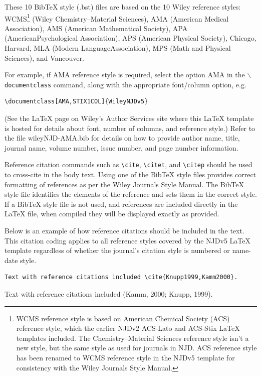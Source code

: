 \documentclass[11pt]{article}
\begin{document}
\noindent These 10 BibTeX style (.bst) f{i}les are based on the 10 Wiley reference styles: WCMS\footnote{WCMS reference style is based on American Chemical Society (ACS) reference style, which the earlier NJDv2 ACS-Lato and ACS-Stix LaTeX templates included. The Chemistry--Material Sciences reference style isn’t a new style, but the same style as used for journals in NJD. ACS reference style has been renamed to WCMS reference style in the NJDv5 template for consistency with the Wiley Journals Style Manual.} (Wiley Chemistry–Material Sciences), AMA (American Medical Association), AMS (American Mathematical Society), APA (American\break Psychological Association), APS (American Physical Society), Chicago, Harvard, MLA (Modern Language\break Association), MPS (Math and Physical Sciences), and Vancouver.

For example, if AMA reference style is required, select the option AMA in the {\tt $\backslash$documentclass} command, along with the appropriate font/column option, e.g.
\begin{verbatim}
\documentclass[AMA,STIX1COL]{WileyNJDv5}
\end{verbatim}
(See the LaTeX page on Wiley’s Author Services site where this LaTeX template is hosted for details about
font, number of columns, and reference style.)
Refer to the f{i}le wileyNJD-AMA.bib for details on how to provide author name, title, journal name, volume number, issue number, and page number information.

Reference citation commands such as \verb|\cite|, \verb|\citet|, and  \verb|\citep| should be used to cross-cite in the body text. Using one of the BibTeX style f{i}les provides correct formatting of references as per the Wiley Journals Style Manual. The BibTeX style f{i}le identif{i}es the elements of the reference  and sets them in the correct style.
If a BibTeX style f{i}le is not used, and references are included directly in the LaTeX f{i}le, when compiled they will be displayed exactly as provided.

Below is an example of how reference citations should be included in the text. This citation coding applies to all reference styles covered by the NJDv5 LaTeX template regardless of whether the journal's citation style is numbered or name-date style.
\begin{verbatim}
Text with reference citations included \cite{Knupp1999,Kamm2000}.
\end{verbatim}
Text with reference citations included (Kamm, 2000; Knupp, 1999).\vskip12pt
\end{document}
